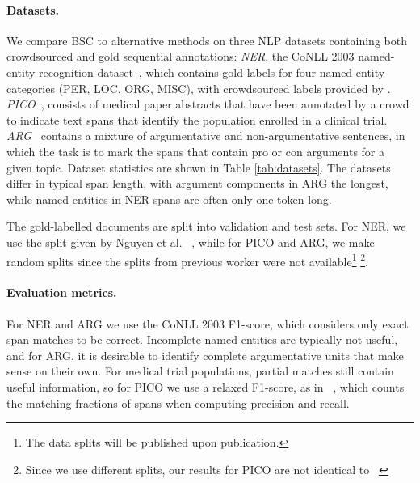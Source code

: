 \paragraph{Datasets. }\label{sec:expts}

We compare BSC to alternative methods on three NLP datasets
containing both crowdsourced and gold sequential annotations:
\emph{NER}, the CoNLL 2003 named-entity recognition dataset~\cite{tjong2003introduction},
which contains gold labels for four named entity categories (PER, LOC, ORG, MISC),
with crowdsourced labels provided by \cite{rodrigues2014sequence}.
\emph{PICO}~\cite{nguyen2017aggregating}, 
consists of medical paper abstracts that have been annotated by a crowd to indicate text spans that identify the population enrolled in a clinical trial. 
\emph{ARG}~\cite{trautmann2019robust} contains a mixture of argumentative and non-argumentative sentences, in which the task is to mark the spans 
that contain pro or con arguments for a given topic. 
Dataset statistics are shown in Table \ref{tab:datasets}. 
The datasets differ in typical span length, with argument components in ARG the longest, while named entities in NER spans are often only
one token long.

The gold-labelled documents are split into validation and test sets. 
For NER, we use the split given by Nguyen et al. ~,
while for PICO and ARG, we make random splits since the splits from previous worker
were not available\footnote{The data splits will be published upon publication.}
\footnote{Since we use different splits, our results for PICO are not identical to ~\citet{nguyen2017aggregating}}.

\paragraph{Evaluation metrics. }
For NER and ARG we use the CoNLL 2003 F1-score, which considers only exact span matches %
to be correct. Incomplete named entities are typically not useful, and for ARG, it is desirable to identify complete argumentative units that
make sense on their own. 
For medical trial populations, partial matches still contain useful information, so for PICO we use a relaxed F1-score, as in ~\citet{nguyen2017aggregating}, 
which counts the matching fractions of spans when computing precision and recall. 
 
